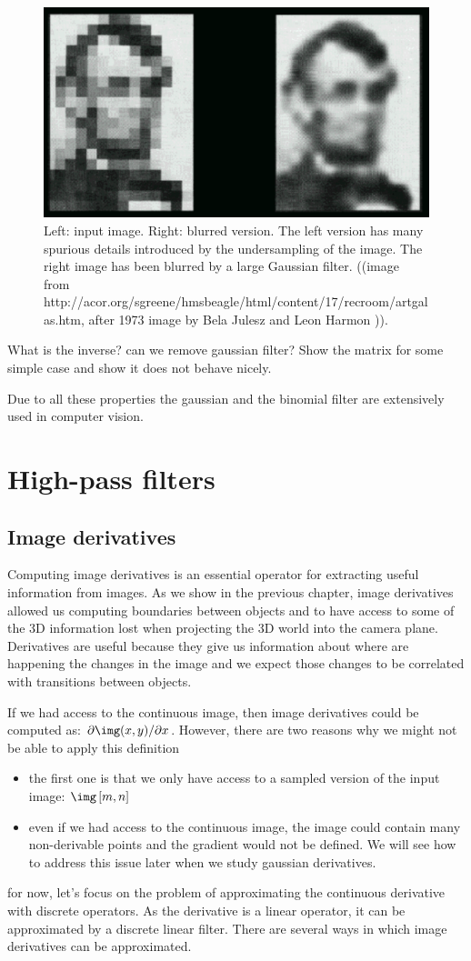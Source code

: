 \begin{figure}
\centerline{
\includegraphics[width=0.55\linewidth]{figures/spatial_filters/lincoln.pdf}}
\caption{Left:  input image.  Right:  blurred version.  The left
  version has many spurious details introduced by the undersampling of
  the image.  The right image has been blurred by a large Gaussian
  filter.  ((image from
  http://acor.org/sgreene/hmsbeagle/html/content/17/recroom/artgalas.htm,
  after 1973 image by Bela Julesz and Leon Harmon )).
} 
\label{fig:lincoln}
\end{figure}


What is the inverse? can we remove gaussian filter? Show the matrix for some simple case and show it does not behave nicely. 

Due to all these properties the gaussian and the binomial filter are extensively used in computer vision. 


\section{High-pass filters}


\subsection{Image derivatives}

Computing image derivatives is an essential operator for extracting useful information from images. As we show in the previous chapter, image derivatives allowed us computing boundaries between objects and to have access to some of the 3D information lost when projecting the 3D world into the camera plane.  Derivatives are useful because they give us information about where are happening the changes in the image and we expect those changes to be correlated with transitions between objects. 


If we had access to the continuous image, then image derivatives could be computed as: $\partial \img(x,y) / \partial x$. However, there are two reasons why we might not be able to apply this definition
\begin{itemize}
\item the first one is that we only have access to a sampled version of the input image: $\img \left[m,n\right]$
\item even if we had access to the continuous image, the image could contain many non-derivable points and the gradient would not be defined. We will see how to address this issue later when we study gaussian derivatives.
\end{itemize}
for now, let's focus on the problem of approximating the continuous derivative with discrete operators. As the derivative is a linear operator, it can be approximated by a discrete linear filter. There are several ways in which image derivatives can be approximated. 

